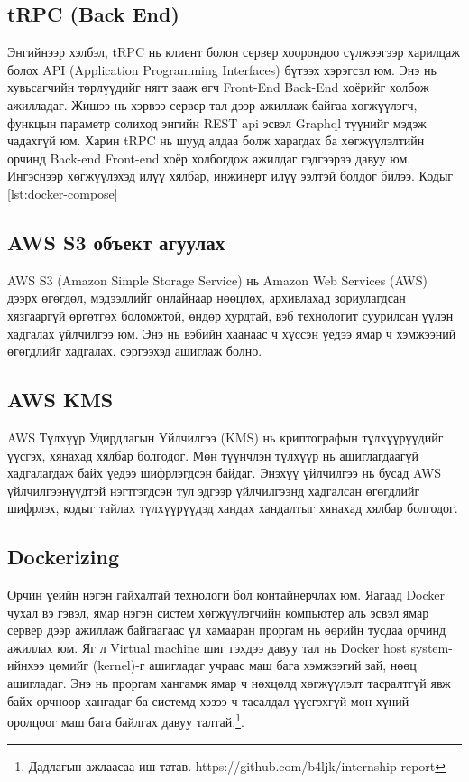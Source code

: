 \subsection{tRPC (Back End)}

Энгийнээр хэлбэл, tRPC нь клиент болон сервер хоорондоо сүлжээгээр харилцаж болох API (Application Programming Interfaces) бүтээх хэрэгсэл юм. Энэ нь хувьсагчийн төрлүүдийг нягт зааж өгч Front-End Back-End хоёрийг холбож ажилладаг. Жишээ нь хэрвээ сервер тал дээр ажиллаж байгаа хөгжүүлэгч, функцын параметр солиход энгийн REST api эсвэл Graphql түүнийг мэдэж чадахгүй юм. Харин tRPC нь шууд алдаа болж харагдах ба хөгжүүлэлтийн орчинд Back-end Front-end хоёр холбогдож ажилдаг гэдгээрээ давуу юм. Ингэснээр хөгжүүлэхэд илүү хялбар, инжинерт илүү ээлтэй болдог билээ.
Кодыг \ref{lst:docker-compose}
\subsection{AWS S3 объект агуулах}
AWS S3 (Amazon Simple Storage Service) нь Amazon Web Services (AWS) дээрх өгөгдөл, мэдээллийг онлайнаар нөөцлөх, архивлахад зориулагдсан хязгааргүй өргөтгөх боломжтой, өндөр хурдтай, вэб технологит суурилсан үүлэн хадгалах үйлчилгээ юм. Энэ нь вэбийн хаанаас ч хүссэн үедээ ямар ч хэмжээний өгөгдлийг хадгалах, сэргээхэд ашиглаж болно.
\subsection{AWS KMS}
AWS Түлхүүр Удирдлагын Үйлчилгээ (KMS) нь криптографын түлхүүрүүдийг үүсгэх, хянахад хялбар болгодог. Мөн түүнчлэн түлхүүр нь ашиглагдаагүй хадгалагдаж байх үедээ шифрлэгдсэн байдаг.
Энэхүү үйлчилгээ нь бусад AWS үйлчилгээнүүдтэй нэгтгэгдсэн тул эдгээр үйлчилгээнд хадгалсан өгөгдлийг шифрлэх, кодыг тайлах түлхүүрүүдэд хандах хандалтыг хянахад хялбар болгодог.

\subsection{Dockerizing}
Орчин үеийн нэгэн гайхалтай технологи бол контайнерчлах юм. Яагаад Docker чухал вэ гэвэл, ямар нэгэн систем хөгжүүлэгчийн компьютер аль эсвэл ямар сервер дээр ажиллаж байгаагаас үл хамааран проргам нь өөрийн тусдаа орчинд ажиллах юм. Яг л Virtual machine шиг гэхдээ давуу тал нь Docker host system-ийнхээ цөмийг (kernel)-г ашигладаг учраас маш бага хэмжээгий зай, нөөц ашигладаг.
Энэ нь проргам хангамж ямар ч нөхцөлд хөгжүүлэлт тасралтгүй явж байх орчноор хангадаг ба системд хэзээ ч тасалдал үүсгэхгүй мөн хүний оролцоог маш бага байлгах давуу талтай.\footnote{Дадлагын ажлаасаа иш татав. https://github.com/b4ljk/internship-report}.

